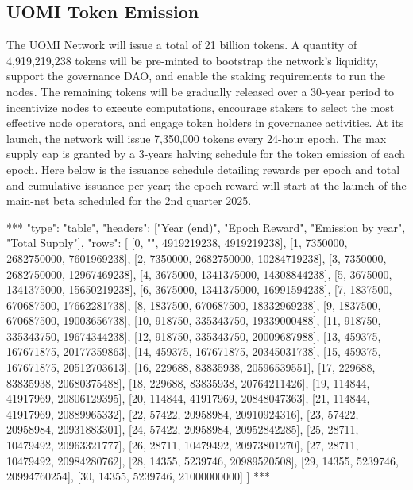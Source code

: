 \documentclass{article}
\begin{document}
\subsection{UOMI Token Emission}

The UOMI Network will issue a total of 21 billion tokens. A quantity of 4,919,219,238 tokens will be pre-minted to bootstrap the network’s liquidity, support the governance DAO, and enable the staking requirements to run the nodes. The remaining tokens will be gradually released over a 30-year period to incentivize nodes to execute computations, encourage stakers to select the most effective node operators, and engage token holders in governance activities. At its launch, the network will issue 7,350,000 tokens every 24-hour epoch. The max supply cap is granted by a 3-years halving schedule for the token emission of each epoch. Here below is the issuance schedule detailing rewards per epoch and total and cumulative issuance per year; the epoch reward will start at the launch of the main-net beta scheduled for the 2nd quarter 2025.

\begin{center}
***
"type": "table",
"headers": ["Year (end)", "Epoch Reward", "Emission by year", "Total Supply"],
"rows": [
  [0, "", 4919219238, 4919219238],
  [1, 7350000, 2682750000, 7601969238],
  [2, 7350000, 2682750000, 10284719238],
  [3, 7350000, 2682750000, 12967469238],
  [4, 3675000, 1341375000, 14308844238],
  [5, 3675000, 1341375000, 15650219238],
  [6, 3675000, 1341375000, 16991594238],
  [7, 1837500, 670687500, 17662281738],
  [8, 1837500, 670687500, 18332969238],
  [9, 1837500, 670687500, 19003656738],
  [10, 918750, 335343750, 19339000488],
  [11, 918750, 335343750, 19674344238],
  [12, 918750, 335343750, 20009687988],
  [13, 459375, 167671875, 20177359863],
  [14, 459375, 167671875, 20345031738],
  [15, 459375, 167671875, 20512703613],
  [16, 229688, 83835938, 20596539551],
  [17, 229688, 83835938, 20680375488],
  [18, 229688, 83835938, 20764211426],
  [19, 114844, 41917969, 20806129395],
  [20, 114844, 41917969, 20848047363],
  [21, 114844, 41917969, 20889965332],
  [22, 57422, 20958984, 20910924316],
  [23, 57422, 20958984, 20931883301],
  [24, 57422, 20958984, 20952842285],
  [25, 28711, 10479492, 20963321777],
  [26, 28711, 10479492, 20973801270],
  [27, 28711, 10479492, 20984280762],
  [28, 14355, 5239746, 20989520508],
  [29, 14355, 5239746, 20994760254],
  [30, 14355, 5239746, 21000000000]
]
***
\end{center}
\end{document}
